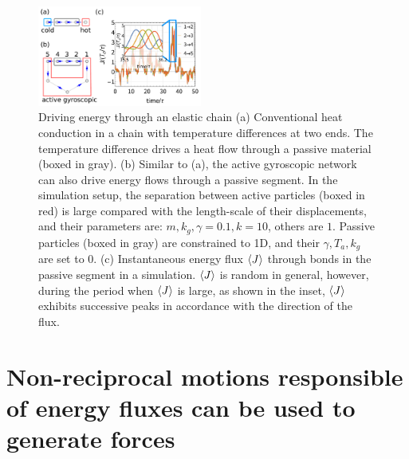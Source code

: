 \documentclass[
 preprint,
 preprintnumbers,
 amsmath,amssymb,
 aps,
 pre,
 longbibliography,
 superscriptaddress,
 10pt, twocolumn
]{revtex4-1}
\begin{document}
\begin{figure}[tbp]
	\centering
	\includegraphics[width=0.48\textwidth]{simulation_j.pdf}
    \caption{
    Driving energy through an elastic chain
    (a) Conventional heat conduction in a chain with temperature differences at two ends. The temperature difference drives a heat flow through a passive material (boxed in gray).
    (b) Similar to (a), the active gyroscopic network can also drive energy flows through a passive segment. In the simulation setup, the separation between active particles (boxed in red) is large compared with the length-scale of their displacements, and their parameters are: $m,k_g,\gamma=0.1, k=10$, others are $1$. Passive particles (boxed in gray) are constrained to 1D, and their $\gamma,T_a,k_g$ are set to $0$.
    (c) Instantaneous energy flux $\expval{J}$ through bonds in the passive segment in a simulation. $\expval{J}$ is random in general, however, during the period when $\expval{J}$ is large, as shown in the inset, $\expval{J}$ exhibits successive peaks in accordance with the direction of the flux.
    }
    \label{fig:simulation}
\end{figure}
\section{Non-reciprocal motions responsible of energy fluxes can be used to generate forces} \label{sec:swimmer}
\end{document}
